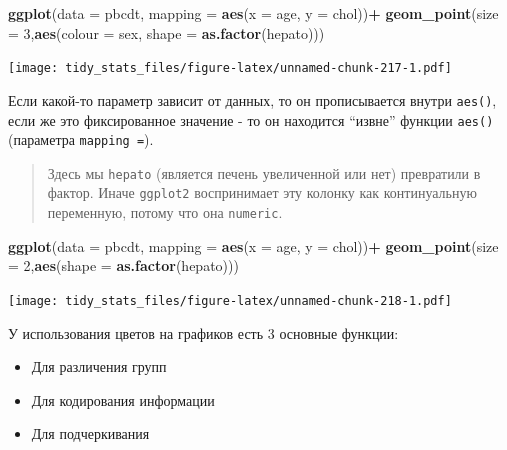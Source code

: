 \documentclass[]{book}
\newenvironment{Shaded}{\begin{snugshade}}{\end{snugshade}}
\newcommand{\KeywordTok}[1]{\textcolor[rgb]{0.13,0.29,0.53}{\textbf{#1}}}
\newcommand{\DataTypeTok}[1]{\textcolor[rgb]{0.13,0.29,0.53}{#1}}
\newcommand{\DecValTok}[1]{\textcolor[rgb]{0.00,0.00,0.81}{#1}}
\newcommand{\StringTok}[1]{\textcolor[rgb]{0.31,0.60,0.02}{#1}}
\newcommand{\OperatorTok}[1]{\textcolor[rgb]{0.81,0.36,0.00}{\textbf{#1}}}
\newcommand{\NormalTok}[1]{#1}
\begin{document}
\begin{Shaded}
\begin{Highlighting}[]
\KeywordTok{ggplot}\NormalTok{(}\DataTypeTok{data =}\NormalTok{ pbcdt, }\DataTypeTok{mapping =} \KeywordTok{aes}\NormalTok{(}\DataTypeTok{x =}\NormalTok{ age, }\DataTypeTok{y =}\NormalTok{ chol))}\OperatorTok{+}
\StringTok{  }\KeywordTok{geom_point}\NormalTok{(}\DataTypeTok{size =} \DecValTok{3}\NormalTok{,}\KeywordTok{aes}\NormalTok{(}\DataTypeTok{colour =}\NormalTok{ sex, }\DataTypeTok{shape =} \KeywordTok{as.factor}\NormalTok{(hepato)))}
\end{Highlighting}
\end{Shaded}

\texttt{[image: tidy\_stats\_files/figure-latex/unnamed-chunk-217-1.pdf]}

Если какой-то параметр зависит от данных, то он прописывается внутри
\texttt{aes()}, если же это фиксированное значение - то он находится
``извне'' функции \texttt{aes()} (параметра \texttt{mapping\ =}).

\begin{quote}
Здесь мы \texttt{hepato} (является печень увеличенной или нет)
превратили в фактор. Иначе \texttt{ggplot2} воспринимает эту колонку как
континуальную переменную, потому что она \texttt{numeric}.
\end{quote}

\begin{Shaded}
\begin{Highlighting}[]
\KeywordTok{ggplot}\NormalTok{(}\DataTypeTok{data =}\NormalTok{ pbcdt, }\DataTypeTok{mapping =} \KeywordTok{aes}\NormalTok{(}\DataTypeTok{x =}\NormalTok{ age, }\DataTypeTok{y =}\NormalTok{ chol))}\OperatorTok{+}
\StringTok{  }\KeywordTok{geom_point}\NormalTok{(}\DataTypeTok{size =} \DecValTok{2}\NormalTok{,}\KeywordTok{aes}\NormalTok{(}\DataTypeTok{shape =} \KeywordTok{as.factor}\NormalTok{(hepato)))}
\end{Highlighting}
\end{Shaded}

\texttt{[image: tidy\_stats\_files/figure-latex/unnamed-chunk-218-1.pdf]}

У использования цветов на графиков есть 3 основные функции:

\begin{itemize}
\item
  Для различения групп
\item
  Для кодирования информации
\item
  Для подчеркивания
\end{itemize}
\end{document}
